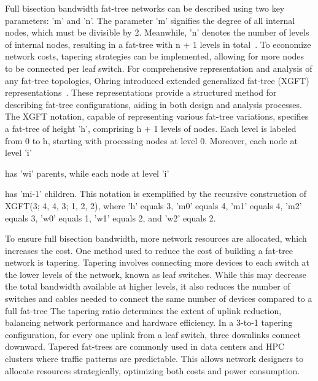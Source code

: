 Full bisection bandwidth fat-tree networks can be described
using two key parameters: 'm' and 'n'. The parameter 'm' signifies the degree of
all internal nodes, which must be divisible by 2. Meanwhile, 'n' denotes the
number of levels of internal nodes, resulting in a fat-tree with n + 1 levels in
total~\cite{leiserson1985fat}.  To economize network costs, tapering strategies can be implemented,
allowing for more nodes to be connected per leaf switch. For
comprehensive representation and analysis of any fat-tree topologies, Ohring
introduced extended generalized fat-tree (XGFT) representations~\cite{ohring1995generalized}. These
representations provide a structured method for describing fat-tree
configurations, aiding in both design and analysis processes. The XGFT notation,
capable of representing various fat-tree variations, specifies a fat-tree of
height 'h', comprising h + 1 levels of nodes. Each level is labeled from 0 to h,
starting with processing nodes at level 0. Moreover, each node at level 'i' 

has 'wi' parents, while each node at level 'i' 

has 'mi-1'
children. This notation is exemplified by the recursive construction of XGFT(3;
4, 4, 3; 1, 2, 2), where 'h' equals 3, 'm0' equals 4, 'm1' equals 4, 'm2' equals
3, 'w0' equals 1, 'w1' equals 2, and 'w2' equals 2.  



To ensure full bisection bandwidth, more network resources are allocated, which increases
the cost.  One method used to reduce the cost of building a fat-tree network is
tapering. Tapering involves connecting more devices to each switch at the lower
levels of the network, known as leaf switches. While this may decrease the total
bandwidth available at higher levels, it also reduces the number of switches and
cables needed to connect the same number of devices compared to a full fat-tree
The tapering ratio determines the extent of uplink reduction, balancing network performance and hardware efficiency. In a 3-to-1 tapering configuration, for every one uplink from a leaf switch, three downlinks connect downward. Tapered fat-trees are commonly used in data centers and HPC clusters where traffic patterns are predictable. This allows network designers to allocate resources strategically, optimizing both costs and power consumption.

